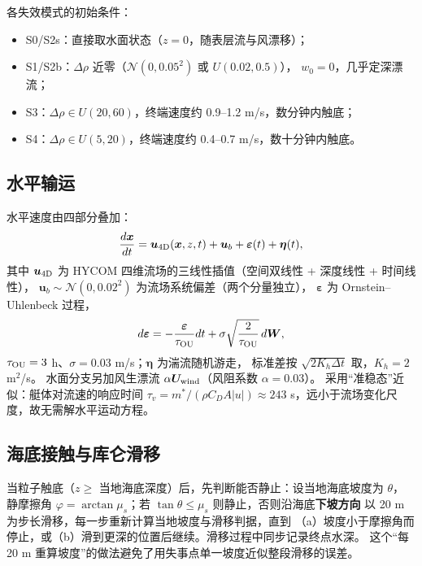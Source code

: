 各失效模式的初始条件：
\begin{itemize}[leftmargin=1.8em,itemsep=0pt]
\item S0/S2s：直接取水面状态（$z=0$，随表层流与风漂移）；
\item S1/S2b：$\Delta\rho$ 近零（$\mathcal N(0,0.05^2)$ 或 $U(0.02,0.5)$），
      $w_0=0$，几乎定深漂流；
\item S3：$\Delta\rho\in U(20,60)$，终端速度约 0.9--1.2 m/s，数分钟内触底；
\item S4：$\Delta\rho\in U(5,20)$，终端速度约 0.4--0.7 m/s，数十分钟内触底。
\end{itemize}



\subsection{水平输运}

水平速度由四部分叠加：
\begin{equation}
  \frac{d\bm x}{dt} = \bm u_{\rm 4D}(\bm x, z, t) + \bm u_b + \bm\varepsilon(t) + \bm\eta(t),
  \label{eq:horizontal}
\end{equation}
其中 $\bm u_{\rm 4D}$ 为 HYCOM 四维流场的三线性插值（空间双线性 + 深度线性 + 时间线性），
$\bm u_b\sim\mathcal N(0,0.02^2)$ 为流场系统偏差（两个分量独立），
$\bm\varepsilon$ 为 Ornstein--Uhlenbeck 过程，
\begin{equation}
  d\bm\varepsilon = -\frac{\bm\varepsilon}{\tau_{\rm OU}}dt
  + \sigma\sqrt{\frac{2}{\tau_{\rm OU}}}\,d\bm W,
\end{equation}
$\tau_{\rm OU}=3$ h、$\sigma=0.03$ m/s；$\bm\eta$ 为湍流随机游走，
标准差按 $\sqrt{2K_h\Delta t}$ 取，$K_h=2$ m$^2$/s。
水面分支另加风生漂流 $\alpha\bm U_{\rm wind}$（风阻系数 $\alpha=0.03$）。
采用“准稳态”近似：艇体对流速的响应时间
$\tau_v=m^*/(\rho C_D A|u|)\approx 243$ s，远小于流场变化尺度，故无需解水平运动方程。

\subsection{海底接触与库仑滑移}

当粒子触底（$z\ge$ 当地海底深度）后，先判断能否静止：设当地海底坡度为 $\theta$，
静摩擦角 $\varphi=\arctan\mu_s$；若 $\tan\theta\le\mu_s$ 则静止，否则沿海底\textbf{下坡方向}
以 20 m 为步长滑移，每一步重新计算当地坡度与滑移判据，直到
（a）坡度小于摩擦角而停止，或（b）滑到更深的位置后继续。滑移过程中同步记录终点水深。
这个“每 20 m 重算坡度”的做法避免了用失事点单一坡度近似整段滑移的误差。

